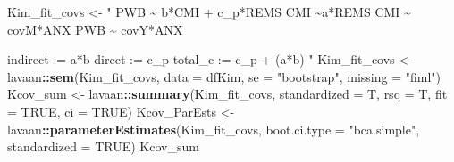 \documentclass[
  11pt,
]{book}
\newenvironment{Shaded}{\begin{snugshade}}{\end{snugshade}}
\newcommand{\AttributeTok}[1]{\textcolor[rgb]{0.27,0.27,0.27}{#1}}
\newcommand{\ConstantTok}[1]{\textcolor[rgb]{0.37,0.37,0.37}{#1}}
\newcommand{\FunctionTok}[1]{\textcolor[rgb]{0.27,0.27,0.27}{\textbf{#1}}}
\newcommand{\NormalTok}[1]{#1}
\newcommand{\OtherTok}[1]{\textcolor[rgb]{0.37,0.37,0.37}{#1}}
\newcommand{\SpecialCharTok}[1]{\textcolor[rgb]{0.43,0.43,0.43}{\textbf{#1}}}
\newcommand{\StringTok}[1]{\textcolor[rgb]{0.5,0.5,0.5}{#1}}
\begin{document}
\begin{Shaded}
\begin{Highlighting}[]
\NormalTok{Kim\_fit\_covs }\OtherTok{\textless{}{-}} \StringTok{"}
\StringTok{          PWB \textasciitilde{} b*CMI + c\_p*REMS }
\StringTok{          CMI \textasciitilde{}a*REMS}
\StringTok{          CMI \textasciitilde{} covM*ANX}
\StringTok{          PWB \textasciitilde{} covY*ANX}

\StringTok{          indirect :=  a*b}
\StringTok{          direct  := c\_p}
\StringTok{          total\_c  := c\_p + (a*b)}
\StringTok{          "}
\NormalTok{Kim\_fit\_covs }\OtherTok{\textless{}{-}}\NormalTok{ lavaan}\SpecialCharTok{::}\FunctionTok{sem}\NormalTok{(Kim\_fit\_covs, }\AttributeTok{data =}\NormalTok{ dfKim, }\AttributeTok{se =} \StringTok{"bootstrap"}\NormalTok{,}
    \AttributeTok{missing =} \StringTok{"fiml"}\NormalTok{)}
\NormalTok{Kcov\_sum }\OtherTok{\textless{}{-}}\NormalTok{ lavaan}\SpecialCharTok{::}\FunctionTok{summary}\NormalTok{(Kim\_fit\_covs, }\AttributeTok{standardized =}\NormalTok{ T, }\AttributeTok{rsq =}\NormalTok{ T, }\AttributeTok{fit =} \ConstantTok{TRUE}\NormalTok{,}
    \AttributeTok{ci =} \ConstantTok{TRUE}\NormalTok{)}
\NormalTok{Kcov\_ParEsts }\OtherTok{\textless{}{-}}\NormalTok{ lavaan}\SpecialCharTok{::}\FunctionTok{parameterEstimates}\NormalTok{(Kim\_fit\_covs, }\AttributeTok{boot.ci.type =} \StringTok{"bca.simple"}\NormalTok{,}
    \AttributeTok{standardized =} \ConstantTok{TRUE}\NormalTok{)}
\NormalTok{Kcov\_sum}
\end{Highlighting}
\end{Shaded}
\end{document}
